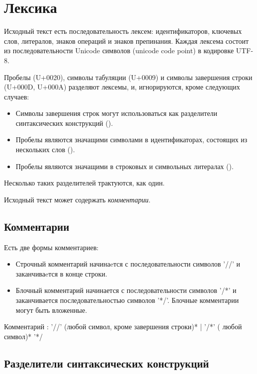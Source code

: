 \hypertarget{lexica}{%
\section{Лексика}\label{lex:chapter}}

Исходный текст есть последовательность лексем: идентификаторов, ключевых слов, литералов, знаков операций и знаков препинания. 
Каждая лексема состоит из последовательности Unicode символов (unicode code point) в кодировке UTF-8.

Пробелы (U+0020), символы табуляции (U+0009) и символы завершения строки (U+000D, U+000A) разделяют лексемы, и, игнорируются, кроме следующих случаев:
\begin{itemize}
\item
Символы завершения строк могут использоваться как разделители синтаксических конструкций ().
\item
  Пробелы являются значащими символами в идентификаторах, состоящих из нескольких слов (). 
\item
  Пробелы являются значащими в строковых и символьных литералах (). 
\end{itemize}

Несколько таких разделителей трактуются, как один.

Исходный текст может содержать \emph{комментарии}.

\hypertarget{comments}{%
\subsection{Комментарии}\label{lex:comments}}

Есть две формы комментариев:
\begin{itemize}
\item
Строчный комментарий начинаeтся с последовательности символов '//' и заканчиваeтся в конце строки.
\item
Блочный комментарий начинается с последовательности символов '/*' и заканчивается последовательностью символов '*/'. 
Блочные комментарии могут быть вложенные.
\end{itemize}

\begin{Grammar}
Комментарий
    : '//' (любой символ, кроме завершения строки)*
    | '/*'  ( любой символ)* '*/
\end{Grammar}

\hypertarget{separators}{%
\subsection{Разделители синтаксических конструкций}\label{lex:separators}}

